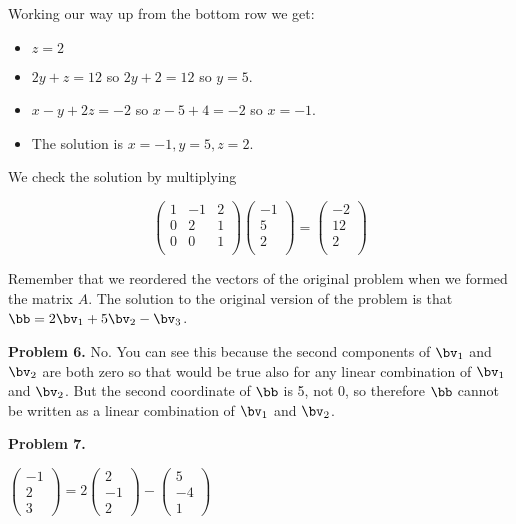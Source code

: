 \documentclass[oneside,12pt]{amsart}
\begin{document}
Working our way up from the bottom row we get:
\begin{itemize}
\item $z = 2$
\item $2y + z = 12$ so $2y + 2 = 12$ so $y=5$.
\item $x - y + 2z = -2$ so $x - 5 + 4 = -2$ so $x= -1$.
\item The solution is $x=-1, y=5, z= 2$.
\end{itemize}

We check the solution by multiplying

$$
\begin{pmatrix}
1 & -1 & 2 \\
0 &  2 & 1 \\
0 &  0 & 1  \\
\end{pmatrix}
\begin{pmatrix}
-1 \\
5 \\
2 \\
\end{pmatrix}
=
\begin{pmatrix}
-2 \\
12 \\
2 \\
\end{pmatrix}
$$

Remember that we reordered the vectors of the original problem when we
formed the matrix $A$. The solution to the original version of the problem is
that $\bb = 2\bv_1  + 5 \bv_2 -\bv_3$.

\bigskip

\textbf{Problem 6.}  No. You can see this because the second components
of $\bv_1$ and $\bv_2$ are both zero so that would be true also for any linear
combination of $\bv_1$ and $\bv_2$. But the second coordinate of $\bb$ is 5,
not 0, so therefore $\bb$ cannot be written as a linear combination of $\bv_1$
and $\bv_2$.

\bigskip


\textbf{Problem 7.}

\bigskip

$
\begin{pmatrix}
-1 \\ 2 \\ 3
\end{pmatrix}
=
2
\begin{pmatrix}
2\\ -1 \\ 2
\end{pmatrix}
-
\begin{pmatrix}
5 \\ -4 \\ 1
\end{pmatrix}
$
\bigskip
\end{document}
